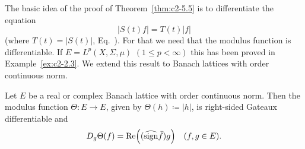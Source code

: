 The basic idea of the proof of Theorem~\ref{thm:c2-5.5}   is to differentiate the equation 
\[
|S(t)f| = T(t)|f|
\]
(where $T(t) = |S(t)|$, \cf Eq.~). For
that we need that the modulus function is differentiable.
If\/ $E = L^{p}(X,\Sigma,\mu)$ $(1 \leq p < \infty)$ this has been proved in Example~\ref{ex:c2-2.3}.
We extend this result to Banach lattices with order continuous norm.
\begin{proposition}\label{prop:c2-5.6}
Let $E$ be a real or complex Banach lattice with order continuous norm. 
Then the modulus function $\Theta \colon E \to E$, given by $\Theta(h) \coloneq |h|$, is right-sided Gateaux differentiable and
\begin{equation}\label{eq:c2-5.6}
D_{g}\Theta(f) = \Re\mleft((\widehat{\sign}  \bar{f})g\mright) \quad (f, g \in E).
\end{equation}
\end{proposition}
